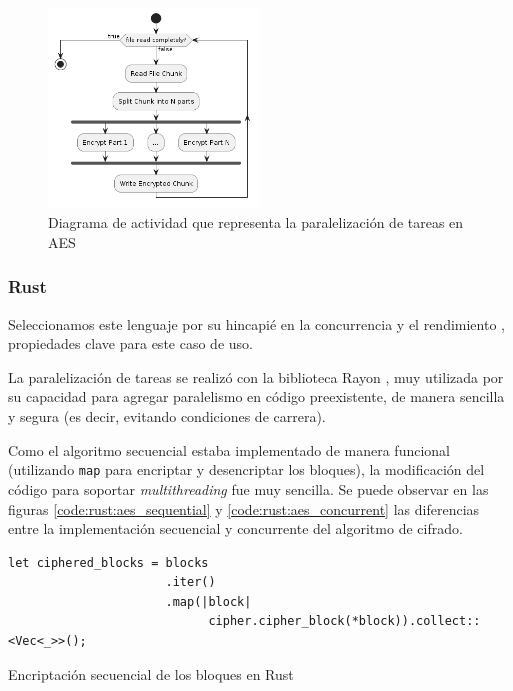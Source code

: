 \documentclass[11pt]{article}
\let\Oldsubsubsection\subsubsection
\renewcommand{\subsubsection}{\FloatBarrier\Oldsubsubsection}
\newcommand{\english}[1]{\textit{#1}}
\begin{document}
\begin{figure}[h]
    \centering
    \includegraphics[width=0.5\textwidth]{resources/aes/activity_diagram.png}
    \caption{Diagrama de actividad que representa la paralelización de tareas en AES}
    \label{fig:aes:activity}
\end{figure}

\subsubsection{Rust}

Seleccionamos este lenguaje por su hincapié en la concurrencia \cite{rust:ex:fearless_concurrency} y el rendimiento \cite{com:rust}, propiedades clave para este caso de uso.

La paralelización de tareas se realizó con la biblioteca Rayon \cite{aes:rayon}, muy utilizada por su capacidad para agregar paralelismo en código preexistente, de manera sencilla y segura (es decir, evitando condiciones de carrera).

Como el algoritmo secuencial estaba implementado de manera funcional (utilizando \lstinline{map} para encriptar y desencriptar los bloques), la modificación del código para soportar \english{multithreading} fue muy sencilla. Se puede observar en las figuras \ref{code:rust:aes_sequential} y \ref{code:rust:aes_concurrent} las diferencias entre la implementación secuencial y concurrente del algoritmo de cifrado.

\begin{listing}[h]
\begin{verbatim}
let ciphered_blocks = blocks
                      .iter()
                      .map(|block|
                            cipher.cipher_block(*block)).collect::<Vec<_>>();
\end{verbatim}
\caption{Encriptación secuencial de los bloques en Rust}
\label{code:rust:aes_sequential}
\end{listing}
\end{document}
